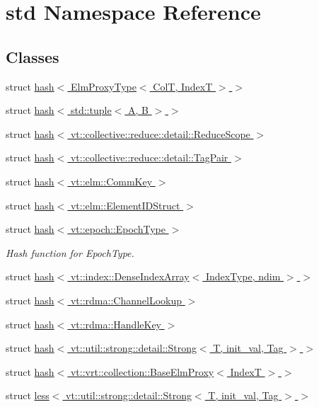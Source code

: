 \hypertarget{namespacestd}{}\section{std Namespace Reference}
\label{namespacestd}
\subsection*{Classes}
\begin{DoxyCompactItemize}
\item 
struct \hyperlink{structstd_1_1hash_3_01_elm_proxy_type_3_01_col_t_00_01_index_t_01_4_01_4}{hash$<$ Elm\+Proxy\+Type$<$ Col\+T, Index\+T $>$ $>$}
\item 
struct \hyperlink{structstd_1_1hash_3_01std_1_1tuple_3_01_a_00_01_b_01_4_01_4}{hash$<$ std\+::tuple$<$ A, B $>$ $>$}
\item 
struct \hyperlink{structstd_1_1hash_3_01vt_1_1collective_1_1reduce_1_1detail_1_1_reduce_scope_01_4}{hash$<$ vt\+::collective\+::reduce\+::detail\+::\+Reduce\+Scope $>$}
\item 
struct \hyperlink{structstd_1_1hash_3_01vt_1_1collective_1_1reduce_1_1detail_1_1_tag_pair_01_4}{hash$<$ vt\+::collective\+::reduce\+::detail\+::\+Tag\+Pair $>$}
\item 
struct \hyperlink{structstd_1_1hash_3_01vt_1_1elm_1_1_comm_key_01_4}{hash$<$ vt\+::elm\+::\+Comm\+Key $>$}
\item 
struct \hyperlink{structstd_1_1hash_3_01vt_1_1elm_1_1_element_i_d_struct_01_4}{hash$<$ vt\+::elm\+::\+Element\+I\+D\+Struct $>$}
\item 
struct \hyperlink{structstd_1_1hash_3_01vt_1_1epoch_1_1_epoch_type_01_4}{hash$<$ vt\+::epoch\+::\+Epoch\+Type $>$}
\begin{DoxyCompactList}\small\item\em Hash function for {\ttfamily Epoch\+Type}. \end{DoxyCompactList}\item 
struct \hyperlink{structstd_1_1hash_3_01vt_1_1index_1_1_dense_index_array_3_01_index_type_00_01ndim_01_4_01_4}{hash$<$ vt\+::index\+::\+Dense\+Index\+Array$<$ Index\+Type, ndim $>$ $>$}
\item 
struct \hyperlink{structstd_1_1hash_3_01vt_1_1rdma_1_1_channel_lookup_01_4}{hash$<$ vt\+::rdma\+::\+Channel\+Lookup $>$}
\item 
struct \hyperlink{structstd_1_1hash_3_01vt_1_1rdma_1_1_handle_key_01_4}{hash$<$ vt\+::rdma\+::\+Handle\+Key $>$}
\item 
struct \hyperlink{structstd_1_1hash_3_01vt_1_1util_1_1strong_1_1detail_1_1_strong_3_01_t_00_01init__val_00_01_tag_01_4_01_4}{hash$<$ vt\+::util\+::strong\+::detail\+::\+Strong$<$ T, init\+\_\+val, Tag $>$ $>$}
\item 
struct \hyperlink{structstd_1_1hash_3_01vt_1_1vrt_1_1collection_1_1_base_elm_proxy_3_01_index_t_01_4_01_4}{hash$<$ vt\+::vrt\+::collection\+::\+Base\+Elm\+Proxy$<$ Index\+T $>$ $>$}
\item 
struct \hyperlink{structstd_1_1less_3_01vt_1_1util_1_1strong_1_1detail_1_1_strong_3_01_t_00_01init__val_00_01_tag_01_4_01_4}{less$<$ vt\+::util\+::strong\+::detail\+::\+Strong$<$ T, init\+\_\+val, Tag $>$ $>$}
\end{DoxyCompactItemize}
